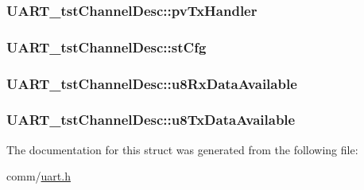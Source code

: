 \subsubsection[{pv\+Tx\+Handler}]{ U\+A\+R\+T\+\_\+tst\+Channel\+Desc\+::pv\+Tx\+Handler}\label{struct_u_a_r_t__tst_channel_desc_ab30010b6d09c6b1271e60be3876137b2}
\hypertarget{struct_u_a_r_t__tst_channel_desc_a45e955ba130b83a3932d0972bc35e35d}{}
\subsubsection[{st\+Cfg}]{ U\+A\+R\+T\+\_\+tst\+Channel\+Desc\+::st\+Cfg}\label{struct_u_a_r_t__tst_channel_desc_a45e955ba130b83a3932d0972bc35e35d}
\hypertarget{struct_u_a_r_t__tst_channel_desc_a2a84d2c1824e364b60b24008e4f91ecf}{}
\subsubsection[{u8\+Rx\+Data\+Available}]{ U\+A\+R\+T\+\_\+tst\+Channel\+Desc\+::u8\+Rx\+Data\+Available}\label{struct_u_a_r_t__tst_channel_desc_a2a84d2c1824e364b60b24008e4f91ecf}
\hypertarget{struct_u_a_r_t__tst_channel_desc_a2ebf4266655d42a0c591a355912786d9}{}
\subsubsection[{u8\+Tx\+Data\+Available}]{ U\+A\+R\+T\+\_\+tst\+Channel\+Desc\+::u8\+Tx\+Data\+Available}\label{struct_u_a_r_t__tst_channel_desc_a2ebf4266655d42a0c591a355912786d9}


The documentation for this struct was generated from the following file\+:\begin{DoxyCompactItemize}
\item 
comm/\hyperlink{uart_8h}{uart.\+h}\end{DoxyCompactItemize}
